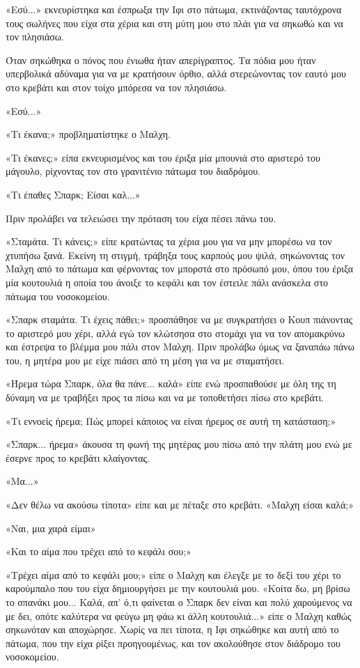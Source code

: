 \documentclass[12pt,twoside, openany]{book}
\begin{document}
«Εσύ...» εκνευρίστηκα και έσπρωξα την Ιφι στο πάτωμα, εκτινάζοντας ταυτόχρονα τους σωλήνες που είχα στα χέρια και στη μύτη μου στο πλάι για να σηκωθώ και να τον πλησιάσω.

Όταν σηκώθηκα ο πόνος που ένιωθα ήταν απερίγραπτος. Τα πόδια μου ήταν υπερβολικά αδύναμα για να με κρατήσουν όρθιο, αλλά στερεώνοντας τον εαυτό μου στο κρεβάτι και στον τοίχο μπόρεσα να τον πλησιάσω.

«Εσύ...»

«Τι έκανα;» προβληματίστηκε ο Μαλχη.

«Τι έκανες;» είπα εκνευρισμένος και του έριξα μία μπουνιά στο αριστερό του μάγουλο, ρίχνοντας τον στο γρανιτένιο πάτωμα του διαδρόμου.

«Τι έπαθες Σπαρκ; Είσαι καλ...»

Πριν προλάβει να τελειώσει την πρόταση του είχα πέσει πάνω του.

«Σταμάτα. Τι κάνεις;» είπε κρατώντας τα χέρια μου για να μην μπορέσω να τον χτυπήσω ξανά. Εκείνη τη στιγμή, τράβηξα τους καρπούς μου ψιλά, σηκώνοντας τον Μαλχη από το πάτωμα και φέρνοντας τον μπορστά στο πρόσωπό μου, όπου του έριξα μία κουτουλιά η οποία του άνοιξε το κεφάλι και τον έστειλε πάλι ανάσκελα στο πάτωμα του νοσοκομείου.

«Σπαρκ σταμάτα. Τι έχεις πάθει;» προσπάθησε να με συγκρατήσει ο Κουπ πιάνοντας το αριστερό μου χέρι, αλλά εγώ τον κλώτσησα στο στομάχι για να τον απομακρύνω και έστρεψα το βλέμμα μου πάλι στον Μαλχη. Πριν προλάβω όμως να ξαναπάω πάνω του, η μητέρα μου με είχε πιάσει από τη μέση για να με σταματήσει.

«Ήρεμα τώρα Σπαρκ, όλα θα πάνε... καλά» είπε ενώ προσπαθούσε με όλη της τη δύναμη να με τραβήξει προς τα πίσω και να με τοποθετήσει πίσω στο κρεβάτι.

«Τι εννοείς ήρεμα; Πώς μπορεί κάποιος να είναι ήρεμος σε αυτή τη κατάσταση;»

«Σπαρκ... ήρεμα» άκουσα τη φωνή της μητέρας μου πίσω από την πλάτη μου ενώ με έσερνε προς το κρεβάτι κλαίγοντας.

«Μα...»

«Δεν θέλω να ακούσω τίποτα» είπε και με πέταξε στο κρεβάτι. «Μαλχη είσαι καλά;»

«Ναι, μια χαρά είμαι»

«Και το αίμα που τρέχει από το κεφάλι σου;»

«Τρέχει αίμα από το κεφάλι μου;» είπε ο Μαλχη και έλεγξε με το δεξί του χέρι το καρούμπαλο που του είχα δημιουργήσει με την κουτουλιά μου. «Κοίτα δω, μη βρίσω το σπανάκι μου... Καλά, απ’ ό,τι φαίνεται ο Σπαρκ δεν είναι και πολύ χαρούμενος να με δει, οπότε καλύτερα να φεύγω μη φάω κι άλλη κουτουλιά...» είπε ο Μαλχη καθώς σηκωνόταν και αποχώρησε. Χωρίς να πει τίποτα, η Ιφι σηκώθηκε και αυτή από το πάτωμα, που την είχα ρίξει προηγουμένως,  και τον ακολούθησε στον διάδρομο του νοσοκομείου.
\end{document}
